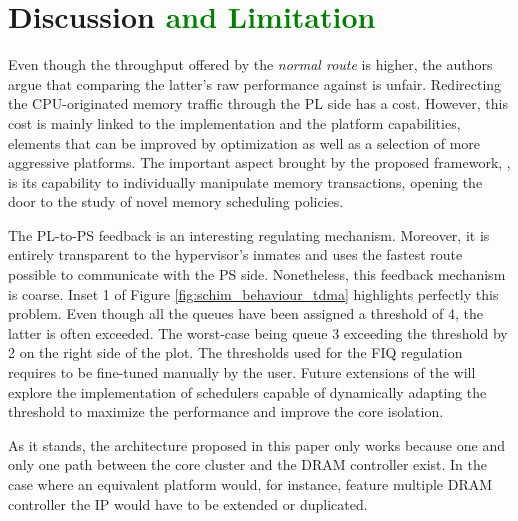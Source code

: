 \section{Discussion \textcolor{green}{and Limitation}}
\color{red}
Even though the throughput offered by the \emph{normal route} is higher, the
authors argue that comparing the latter's raw performance against \schim is unfair.
Redirecting the CPU-originated memory traffic through the PL side has a cost.
However, this cost is mainly linked to the implementation and the platform capabilities, elements that can be improved by optimization as well as a selection of more aggressive platforms.
The important aspect brought by the proposed framework, \schim, is its capability to individually manipulate memory transactions, opening the door to the study of novel memory scheduling policies.

The PL-to-PS feedback is an interesting regulating mechanism. Moreover, it is entirely transparent to the hypervisor's inmates and uses the fastest route possible to communicate with the PS side. Nonetheless, this feedback mechanism is coarse. Inset 1 of Figure \ref{fig:schim_behaviour_tdma} highlights perfectly this problem. Even though all the queues have been assigned a threshold of 4, the latter is often exceeded. The worst-case being queue 3 exceeding the threshold by 2 on the right side of the plot.
The thresholds used for the FIQ regulation requires to be fine-tuned manually by the user. Future extensions of the \schim will explore the implementation of schedulers capable of dynamically adapting the threshold to maximize the performance and improve the core isolation.

\color{green}

As it stands, the architecture proposed in this paper only works because one and
only one path between the core cluster and the DRAM controller exist. In the case
where an equivalent platform would, for instance, feature multiple DRAM controller
the \schim IP would have to be extended or duplicated.

